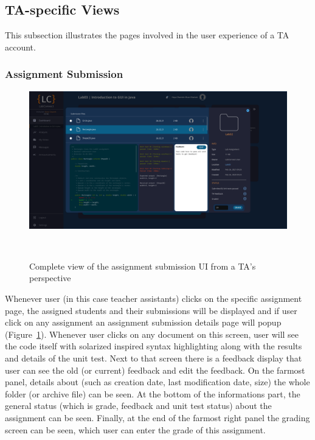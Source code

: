 \documentclass[a4paper, 12pt]{article}
\begin{document}
    \pagebreak
    
    
    \subsection{TA-specific Views}
    
    This subsection illustrates the pages involved in the user experience of a TA account.
    
    \subsubsection{Assignment Submission}
    
    \begin{figure}[H]
        \centering
        \includegraphics[width=\textwidth]{ta_assignment_submission}
        \caption{Complete view of the assignment submission UI from a TA's perspective}~\label{fig:ta_assignment_submission_full}
    \end{figure}
    
    Whenever user (in this case teacher assistants) clicks on the specific assignment page, the assigned students and their submissions will be displayed and if user click on any assignment
    an assignment submission details page will popup (Figure~\ref{fig:ta_assignment_submission_full}). Whenever user clicks on any document on this screen, user will see the code itself with
    solarized inspired syntax highlighting along with the results and details of the unit test. Next to that screen there is a feedback display that user can see the old 
    (or current) feedback and edit the feedback. On the farmost panel, details about (such as creation date, last modification date, size) the whole folder 
    (or archive file) can be seen. At the bottom of the informations part, the general status (which is grade, feedback and unit test status) about the assignment can be seen. 
    Finally, at the end of the farmost right panel the grading screen can be seen, which user can enter the grade of this assignment. 
    
\end{document}
